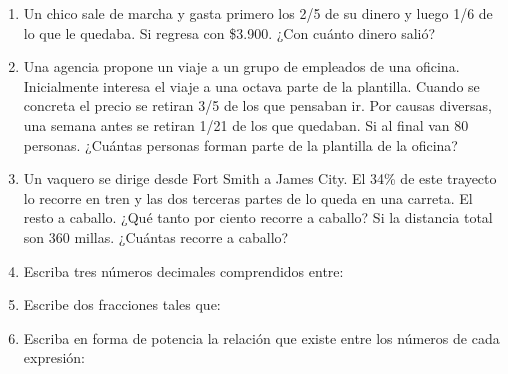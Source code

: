 \documentclass[twoside]{article}
\begin{document}
\begin{enumerate}
\begin{enumerate}
\end{enumerate}
\item Un chico sale de marcha y gasta primero los 2/5 de su dinero y luego 1/6 de lo que le quedaba. Si regresa con \$3.900. ¿Con cuánto dinero salió?
\item Una agencia propone un viaje a un grupo de empleados de una oficina. Inicialmente interesa el viaje a una octava parte de la plantilla. Cuando se concreta el precio se retiran 3/5 de los que pensaban ir. Por causas diversas, una semana antes se retiran 1/21
de los que quedaban. Si al final van 80 personas. ¿Cuántas personas forman parte de la plantilla de la oficina?
\item Un vaquero se dirige desde Fort Smith a James City. El 34\% de este trayecto lo recorre en tren y las dos terceras partes de lo queda en una carreta. El resto a caballo. ¿Qué
tanto por ciento recorre a caballo? Si la distancia total son 360 millas. ¿Cuántas recorre a caballo?
\item Escriba tres números decimales comprendidos entre:
\begin{enumerate}
\end{enumerate}
\item Escribe dos fracciones tales que:
\begin{enumerate}
\end{enumerate}
\item Escriba en forma de potencia la relación que existe entre los números de cada expresión:
\begin{enumerate}
\end{enumerate}
\end{enumerate}
\end{document}
